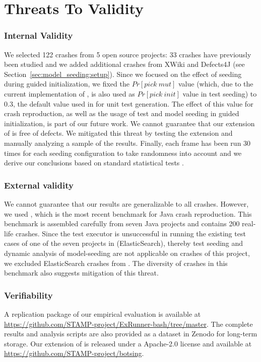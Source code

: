 
\section{Threats To Validity}\label{sec:model_seeding:ttvalidity}

\subsubsection{Internal Validity}
We selected 122 crashes from 5 open source projects: 33 crashes have previously been studied \cite{Soltani2018b} and we added additional crashes from XWiki and Defects4J (see Section~\ref{sec:model_seeding:setup}). 
%
Since we focused on the effect of seeding during guided initialization, we fixed the $Pr[pick\ mut]$ value (which, due to the current implementation of \botsing, is also used as $Pr[pick\ init]$ value in test seeding) to 0.3, the default value used in \evosuite for unit test generation. The effect of this value for crash reproduction, as well as the usage of test and model seeding in guided initialization, is part of our future work.
%
We cannot guarantee that our extension of \botsing is free of defects. We mitigated this threat by testing the extension and manually analyzing a sample of the results.
%
Finally, each frame has been run 30 times for each seeding configuration to take randomness into account and we derive our conclusions based on standard statistical tests \cite{Arcuri2014,Panichella2017c}.

\subsubsection{External validity}
We cannot guarantee that our results are generalizable to all crashes. However, we used \jcrashpack, which is the most recent benchmark for Java crash reproduction. This benchmark is assembled carefully from seven Java projects and contains 200 real-life crashes. Since the \evosuite test executor is unsuccessful in running the existing test cases of one of the seven projects in \jcrashpack (ElasticSearch), thereby test seeding and dynamic analysis of model-seeding are not applicable on crashes of this project, we excluded ElasticSearch crashes from \jcrashpack. The diversity of crashes in this benchmark also suggests mitigation of this threat.

\subsubsection{Verifiability} 
A replication package of our empirical evaluation is available at \url{https://github.com/STAMP-project/ExRunner-bash/tree/master}. The complete results and analysis scripts are also provided as a dataset in Zenodo \cite{pouria_derakhshanfar_2019_3673916} for long-term storage. Our extension of \botsing is released under a Apache-2.0 license and available at \url{https://github.com/STAMP-project/botsing}.





